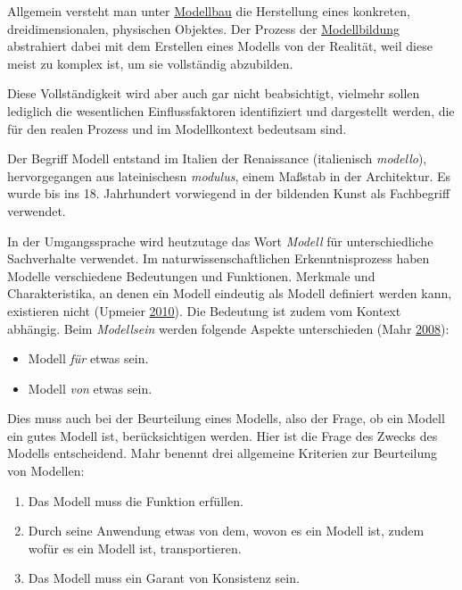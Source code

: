\documentclass[]{article}
\providecommand{\tightlist}{%
  \setlength{\itemsep}{0pt}\setlength{\parskip}{0pt}}
\begin{document}
Allgemein versteht man unter
\href{https://de.wikipedia.org/wiki/Modellbau}{Modellbau} die
Herstellung eines konkreten, dreidimensionalen, physischen Objektes. Der
Prozess der
\href{https://de.wikipedia.org/wiki/Modell\#Modellbildung}{Modellbildung}
abstrahiert dabei mit dem Erstellen eines Modells von der Realität, weil
diese meist zu komplex ist, um sie vollständig abzubilden.

Diese Vollständigkeit wird aber auch gar nicht beabsichtigt, vielmehr
sollen lediglich die wesentlichen Einflussfaktoren identifiziert und
dargestellt werden, die für den realen Prozess und im Modellkontext
bedeutsam sind.

Der Begriff Modell entstand im Italien der Renaissance (italienisch
\emph{modello}), hervorgegangen aus lateinischesn \emph{modulus}, einem
Maßstab in der Architektur. Es wurde bis ins 18. Jahrhundert vorwiegend
in der bildenden Kunst als Fachbegriff verwendet.

In der Umgangssprache wird heutzutage das Wort \emph{Modell} für
unterschiedliche Sachverhalte verwendet. Im naturwissenschaftlichen
Erkenntnisprozess haben Modelle verschiedene Bedeutungen und Funktionen.
Merkmale und Charakteristika, an denen ein Modell eindeutig als Modell
definiert werden kann, existieren nicht (Upmeier
\protect\hyperlink{ref-Upmeier-Krueger-2010}{2010}). Die Bedeutung ist
zudem vom Kontext abhängig. Beim \emph{Modellsein} werden folgende
Aspekte unterschieden (Mahr
\protect\hyperlink{ref-Mahr-Bernd-2008}{2008}):

\begin{itemize}
\tightlist
\item
  Modell \emph{für} etwas sein.
\item
  Modell \emph{von} etwas sein.
\end{itemize}

Dies muss auch bei der Beurteilung eines Modells, also der Frage, ob ein
Modell ein gutes Modell ist, berücksichtigen werden. Hier ist die Frage
des Zwecks des Modells entscheidend. Mahr benennt drei allgemeine
Kriterien zur Beurteilung von Modellen:

\begin{enumerate}
\def\labelenumi{\arabic{enumi}.}
\tightlist
\item
  Das Modell muss die Funktion erfüllen.
\item
  Durch seine Anwendung etwas von dem, wovon es ein Modell ist, zudem
  wofür es ein Modell ist, transportieren.
\item
  Das Modell muss ein Garant von Konsistenz sein.
\end{enumerate}
\end{document}
